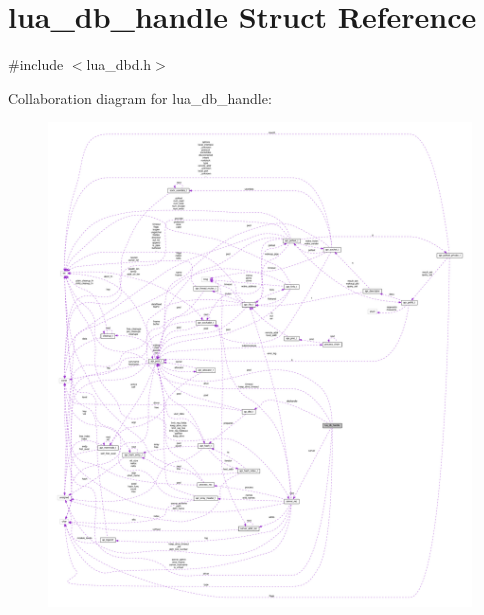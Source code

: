 \hypertarget{structlua__db__handle}{}\section{lua\+\_\+db\+\_\+handle Struct Reference}
\label{structlua__db__handle}


{\ttfamily \#include $<$lua\+\_\+dbd.\+h$>$}



Collaboration diagram for lua\+\_\+db\+\_\+handle\+:
\nopagebreak
\begin{figure}[H]
\begin{center}
\leavevmode
\includegraphics[width=350pt]{structlua__db__handle__coll__graph}
\end{center}
\end{figure}
